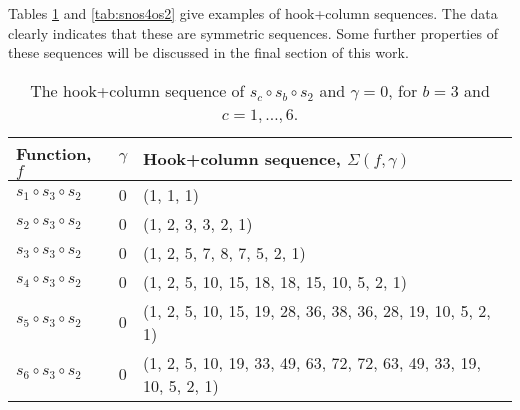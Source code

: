 \documentclass[twoside]{article}
\begin{document}
\begin{ex} Tables \ref{tab:snos3os2} and \ref{tab:snos4os2} give examples of hook+column sequences. The data clearly indicates that these are symmetric sequences. Some further properties of these sequences will be discussed in the final section of this work.
\end{ex}

\begin{table}[h]
    \centering
    {
    \footnotesize %
    \begin{tabular}{  l | l | l }
    \toprule
    Function, $f$ & $\gamma$  & Hook+column sequence, $\Sigma(f, \gamma)$  \\
    \midrule
    $s_1\circ s_3\circ s_2$ & 0 & (1, 1, 1)\\
    $s_2\circ s_3\circ s_2$ & 0 & (1, 2, 3, 3, 2, 1)\\
    $s_3\circ s_3 \circ s_2$ & 0 & (1, 2, 5, 7, 8, 7, 5, 2, 1)\\
    $s_4\circ s_3 \circ s_2$ & 0 & (1, 2, 5, 10, 15, 18, 18, 15, 10, 5, 2, 1)\\
    $s_5\circ s_3 \circ s_2$ & 0 & (1, 2, 5, 10, 15, 19, 28, 36, 38, 36, 28, 19, 10, 5, 2, 1)\\
    $s_6\circ s_3 \circ s_2$ & 0 & (1, 2, 5, 10, 19,  33, 49, 63, 72, 72, 63, 49, 33, 19, 10, 5, 2, 1)\\
    \bottomrule
    \end{tabular}}
    \vspace{.5em } %
    \caption{The hook+column sequence of $s_c\circ s_b\circ s_2$ and $\gamma=0$, for $b= 3$ and $c=1, \ldots, 6$.}
    \label{tab:snos3os2}
\end{table}
\end{document}
